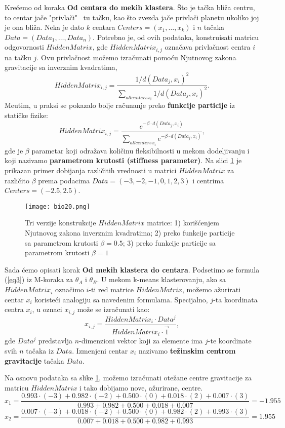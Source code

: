 Krećemo od koraka \textbf{Od centara do mekih klastera}. Što je tačka bliža centru, to centar jače "privlači" \ tu tačku, kao što zvezda jače privlači planetu ukoliko joj je ona bliža. Neka je dato $k$ centara $Centers = (x_1, \dots, x_k)$ i $n$ tačaka $Data = (Data_1, \dots, Data_n)$. Potrebno je, od ovih podataka, konstruisati matricu odgovornosti $HiddenMatrix$, gde $HiddenMatrix_{i,j}$ označava privlačnost centra $i$ na tačku $j$. %
Ovu privlačnost možemo izračunati pomoću Njutnovog zakona gravitacije sa inverznim kvadratima,
$$HiddenMatrix_{i,j} = \frac{1/d(Data_j, x_i)^2}{\sum_{all centers x_i} 1/d(Data_j, x_i)^2}.$$
Me\dj utim, u praksi se pokazalo bolje računanje preko \textbf{funkcije particije} iz statičke fizike:
$$HiddenMatrix_{i,j} = \frac{e^{-\beta \cdot d(Data_j, x_i)}}{\sum_{all centers x_i} e^{-\beta \cdot d(Data_j, x_i)}},$$
gde je $\beta$ parametar koji odražava količinu fleksibilnosti u mekom dodeljivanju i koji nazivamo \textbf{parametrom krutosti (stiffness parameter)}. Na slici \ref{slika 20} je prikazan primer dobijanja različitih vrednosti u matrici $HiddenMatrix$ za različito $\beta$ prema podacima $Data = (-3,-2,-1,0,1,2,3)$ i centrima $Centers = (-2.5,2.5)$.
	

\begin{figure}
    \centering
    \texttt{[image: bio20.png]}
    \caption{Tri verzije konstrukcije $HiddenMatrix$ matrice: 1) korišćenjem Njutnovog zakona inverznim kvadratima; 2) preko funkcije particije sa parametrom krutosti $\beta = 0.5$; 3) preko funkcije particije sa parametrom krutosti $\beta = 1$}
    \label{slika 20}
\end{figure}

Sada ćemo opisati korak \textbf{Od mekih klastera do centara}. Podsetimo se formula (\ref{eq3}) iz M-koraka za $\theta_A$ i $\theta_B$.
U mekom k-means klasterovanju, ako sa $HiddenMatrix_i$ označimo $i$-ti red matrice $HiddenMatrix$, možemo ažurirati centar $x_i$ koristeći analogiju sa navedenim formulama.
Specijalno, $j$-ta koordinata centra $x_i$, u oznaci $x_{i,j}$ može se izračunati kao:
$$x_{i,j} = \frac{HiddenMatrix_i \cdot Data^j}{HiddenMatrix_i \cdot \overrightarrow{1}},$$
gde $Data^j$ predstavlja $n$-dimenzioni vektor koji za elemente ima $j$-te koordinate svih $n$ tačaka iz $Data$. Izmenjeni centar $x_i$	nazivamo \textbf{težinskim centrom gravitacije} tačaka $Data$.

Na osnovu podataka sa slike \ref{slika 20}, možemo izračunati otežane centre gravitacije za matricu $HiddenMatrix$ i tako dobijamo nove, ažurirane, centre.
$$x_1 = \frac{0.993 \cdot (-3) + 0.982 \cdot (-2) + 0.500 \cdot (0) + 0.018 \cdot (2) + 0.007 \cdot (3)}{0.993 + 0.982 + 0.500 + 0.018 + 0.007} = -1.955$$
$$x_2 = \frac{0.007 \cdot (-3) + 0.018 \cdot (-2) + 0.500 \cdot (0) + 0.982 \cdot (2) + 0.993 \cdot (3)}{0.007 + 0.018 + 0.500 + 0.982 + 0.993} = 1.955$$	
	
